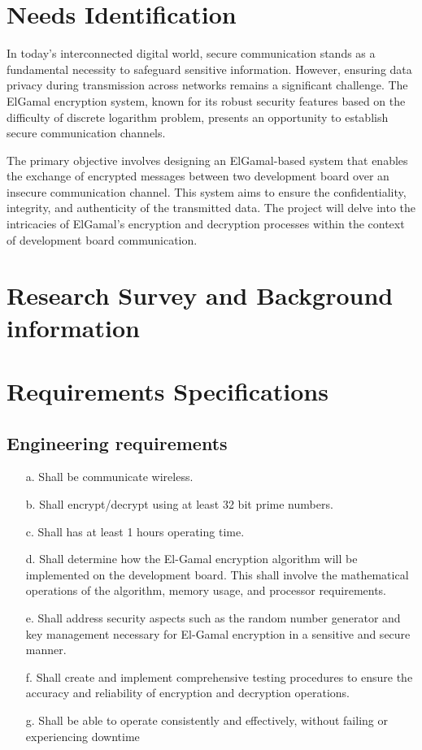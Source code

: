 \documentclass[12pt]{article}
\begin{document}
\vskip 20cm
	\section{Needs Identification}
	In today's interconnected digital world, secure communication stands as a fundamental necessity to safeguard sensitive information. However, ensuring data privacy during transmission across networks remains a significant challenge. The ElGamal encryption system, known for its robust security features based on the difficulty of discrete logarithm problem, presents an opportunity to establish secure communication channels.
		
	The primary objective involves designing an ElGamal-based system that enables the exchange of encrypted messages between two development board over an insecure communication channel. This system aims to ensure the confidentiality, integrity, and authenticity of the transmitted data. The project will delve into the intricacies of ElGamal's encryption and decryption processes within the context of development board communication.
	\section{Research Survey and Background information}
	
	\section{Requirements Specifications}
		
	\subsection{Engineering requirements}
	\begin{enumerate}
		\item[a.] Shall be communicate wireless.
		\item[b.] Shall encrypt/decrypt using at least 32 bit prime numbers.
		\item[c.] Shall has at least 1 hours operating time.
		\item[d.] Shall determine how the El-Gamal encryption algorithm will be implemented on the development board. This shall involve the mathematical operations of the algorithm, memory usage, and processor requirements. 
		\item[e.] Shall address security aspects such as the random number generator and key management necessary for El-Gamal encryption in a sensitive and secure manner.
		\item[f.] Shall create and implement comprehensive testing procedures to ensure the accuracy and reliability of encryption and decryption operations.
		\item[g.] Shall be able to operate consistently and effectively, without failing or
		experiencing downtime
				
	\end{enumerate}
\end{document}
